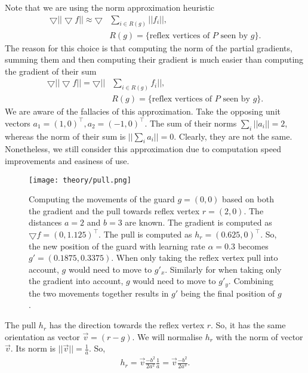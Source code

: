 Note that we are using the norm approximation heuristic 
\begin{align*}
    \bigtriangledown ||\bigtriangledown f|| \approx \bigtriangledown &\sum_{i \in R(g)} ||f_i||, \\
    &R(g) = \{\text{reflex vertices of } P \text{ seen by } g\}. 
\end{align*}
The reason for this choice is that computing the norm of the partial gradients, summing them and then computing their gradient is much easier than computing the gradient of their sum 
\begin{align*}
    \bigtriangledown ||\bigtriangledown f|| = \bigtriangledown ||&\sum_{i \in R(g)} f_i||, \\
    &R(g) = \{\text{reflex vertices of } P \text{ seen by } g\}.
\end{align*}
We are aware of the fallacies of this approximation. Take the opposing unit vectors $a_1 = (1, 0)^\intercal, a_2 = (-1, 0)^\intercal$. The sum of their norms $\sum_i ||a_i|| = 2$, whereas the norm of their sum is $||\sum_i a_i|| = 0$. Clearly, they are not the same. Nonetheless, we still consider this approximation due to computation speed improvements and easiness of use.

\begin{figure*}[!h]
    \texttt{[image: theory/pull.png]}
    \centering
    \caption{Computing the movements of the guard $g = (0, 0)$ based on both the gradient and the pull towards reflex vertex $r = (2, 0)$. The distances $a = 2$ and $b = 3$ are known. The gradient is computed as $\bigtriangledown f = (0, 1.125)^\intercal$. The pull is computed as $h_r  = (0.625, 0)^\intercal$. So, the new position of the guard with learning rate $\alpha = 0.3$ becomes $g' = (0.1875, 0.3375)$. When only taking the reflex vertex pull into account, $g$ would need to move to $g'_x$. Similarly for when taking only the gradient into account, $g$ would need to move to $g'_y$. Combining the two movements together results in $g'$ being the final position of $g$.}
    \label{fig:pull}
\end{figure*}

The pull $h_r$ has the direction towards the reflex vertex $r$. So, it has the same orientation as vector $\vec{v} = (r - g)$. We will normalise $h_r$ with the norm of vector $\vec{v}$. Its norm is $||\vec{v}|| = \frac 1 a$. So, 
\begin{align}
    h_r = \vec{v}\frac{-b^2}{2a^2}\frac 1 a = \vec{v}\frac{-b^2}{2a^3}. \label{eq:h}
\end{align}

